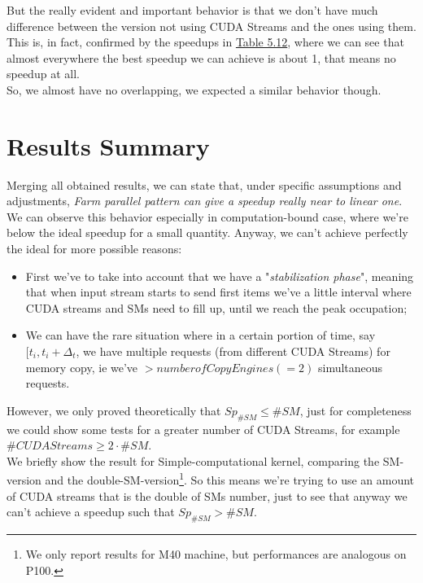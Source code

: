 But the really evident and important behavior is that we don't have much difference between the version not using CUDA Streams and the ones using them.\\
This is, in fact, confirmed by the speedups in \hyperref[tab:imgspeedup]{Table 5.12}, where we can see that almost everywhere the best speedup we can achieve is about 1, that means no speedup at all.\\
So, we almost have no overlapping, we expected a similar behavior though.\\




\section{Results Summary}
Merging all obtained results, we can state that, under specific assumptions and adjustments, \textit{Farm parallel pattern can give a speedup really near to linear one}.\\
We can observe this behavior especially in computation-bound case, where we're below the ideal speedup for a small quantity. Anyway, we can't achieve perfectly the ideal for more possible reasons: 
\begin{itemize}
	\item First we've to take into account that we have a "\textit{stabilization phase}", meaning that when input stream starts to send first items we've a little interval where CUDA streams and SMs need to fill up, until we reach the peak occupation;
	\item We can have the rare situation where in a certain portion of time, say \([t_{i},t_{i}+\Delta_{t}\), we have multiple requests (from different CUDA Streams) for memory copy, ie we've \(> number of Copy Engines (=2)\) simultaneous requests.\\
\end{itemize}
However, we only proved theoretically that \(Sp_{\#SM} \leq \#SM\), just for completeness we could show some tests for a greater number of CUDA Streams, for example\\ \(\#CUDA Streams \geq 2\cdot\#SM\).\\
We briefly show the result for Simple-computational kernel, comparing the SM-version and the double-SM-version\footnote{We only report results for M40 machine, but performances are analogous on P100.}.
So this means we're trying to use an amount of CUDA streams that is the double of SMs number, just to see that anyway we can't achieve a speedup such that \(Sp_{\#SM} > \#SM\).



